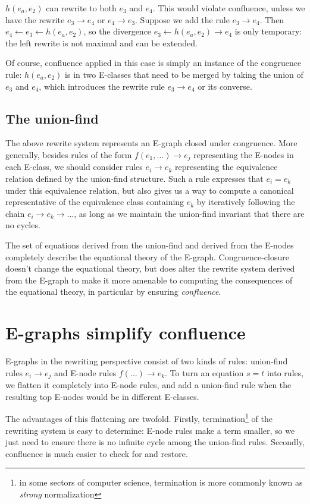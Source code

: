 \documentclass[12pt,a4paper,twoside,openright]{report}
\numberwithin{equation}{chapter}		%
\numberwithin{figure}{chapter}			%
\numberwithin{table}{chapter}			%
\theoremstyle{definition}
\theoremstyle{plain}
\begin{document}
$h(e_a, e_2)$ can rewrite to both $e_3$ and $e_4$. This would violate confluence, unless we have the rewrite $e_3 \rightarrow e_4$ or $e_4 \rightarrow e_3$. Suppose we add the rule $e_3 \rightarrow e_4$. Then $e_4 \leftarrow e_3 \leftarrow h(e_a, e_2)$, so the divergence $e_3 \leftarrow h(e_a, e_2) \rightarrow e_4$ is only temporary: the left rewrite is not maximal and can be extended.

Of course, confluence applied in this case is simply an instance of the congruence rule: $h(e_a, e_2)$ is in two E-classes that need to be merged by taking the union of $e_3$ and $e_4$, which introduces the rewrite rule $e_3 \rightarrow e_4$ or its converse.

\subsection{The union-find}
The above rewrite system represents an E-graph closed under congruence. More generally, besides rules of the form $f(e_1, \ldots) \rightarrow e_j$ representing the E-nodes in each E-class, we should consider rules $e_i \rightarrow e_k$ representing the equivalence relation defined by the union-find structure. Such a rule expresses that $e_i = e_k$ under this equivalence relation, but also gives us a way to compute a canonical representative of the equivalence class containing $e_k$ by iteratively following the chain $e_i \rightarrow e_k \rightarrow \ldots$, as long as we maintain the union-find invariant that there are no cycles.

The set of equations derived from the union-find and derived from the E-nodes completely describe the equational theory of the E-graph. Congruence-closure doesn't change the equational theory, but does alter the rewrite system derived from the E-graph to make it more amenable to computing the consequences of the equational theory, in particular by ensuring \emph{confluence}.

\section{E-graphs simplify confluence}
E-graphs in the rewriting perspective consist of two kinds of rules: union-find rules $e_i \rightarrow e_j$ and E-node rules $f(\ldots) \rightarrow e_k$. To turn an equation $s = t$ into rules, we flatten it completely into E-node rules, and add a union-find rule when the resulting top E-nodes would be in different E-classes.

The advantages of this flattening are twofold. Firstly, termination\footnote{in some sectors of computer science, termination is more commonly known as \emph{strong} normalization} of the rewriting system is easy to determine: E-node rules make a term smaller, so we just need to ensure there is no infinite cycle among the union-find rules. Secondly, confluence is much easier to check for and restore.
\end{document}
